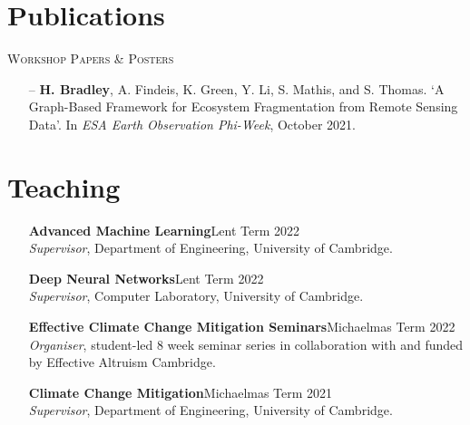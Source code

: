 \documentclass[a4paper,11pt]{article}
\newcommand{\blankline}{\multicolumn{1}{c}{}\\}
\newcommand{\projectitem}{\footnotesize\makebox[1em][l]{\textbullet}\hangindent=1em\ignorespaces}
\begin{document}
\section{Publications}
\textsc{Workshop Papers \& Posters}

\begin{itemize}
    \item[–] \textbf{H. Bradley}, A. Findeis, K. Green, Y. Li, S. Mathis, and S. Thomas. `A Graph-Based Framework for Ecosystem Fragmentation from Remote Sensing Data'. In \textit{ESA Earth Observation Phi-Week}, October 2021.
\end{itemize}


\section{Teaching}
\begin{itemize}
    \item[] \textbf{Advanced Machine Learning}\hfill{Lent Term 2022} \\
    \textit{Supervisor}, Department of Engineering, University of Cambridge.
    \item[] \textbf{Deep Neural Networks}\hfill{Lent Term 2022} \\
    \textit{Supervisor}, Computer Laboratory, University of Cambridge.
    \item[] \textbf{Effective Climate Change Mitigation Seminars}\hfill{Michaelmas Term 2022} \\
    \textit{Organiser}, student-led 8 week seminar series in collaboration with and funded by Effective Altruism Cambridge.
    \item[] \textbf{Climate Change Mitigation}\hfill{Michaelmas Term 2021} \\
    \textit{Supervisor}, Department of Engineering, University of Cambridge.
\end{itemize}
\end{document}
